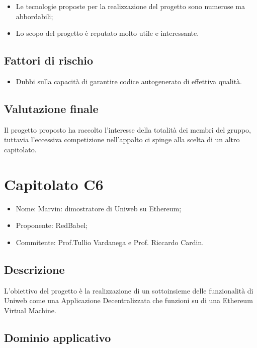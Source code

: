 \documentclass[openany,12pt,a4paper]{report}
\begin{document}
\begin{itemize}
    \item Le tecnologie proposte per la realizzazione del progetto sono numerose ma abbordabili;
    
    \item Lo scopo del progetto è reputato molto utile e interessante.
\end{itemize}

\subsection{Fattori di rischio}

\begin{itemize}
    \item Dubbi sulla capacità di garantire codice autogenerato di effettiva qualità.
\end{itemize}

\subsection{Valutazione finale}

Il progetto proposto ha raccolto l'interesse della totalità dei membri del gruppo, tuttavia l'eccessiva competizione nell'appalto ci spinge alla scelta di un altro capitolato.


\section{Capitolato C6}

\begin{itemize}
    \item{Nome:} Marvin: dimostratore di Uniweb su Ethereum;
    \item{Proponente:} RedBabel;
    \item{Commitente:} Prof.Tullio Vardanega e Prof. Riccardo Cardin.
\end{itemize}

\subsection{Descrizione}

L'obiettivo del progetto è la realizzazione di un sottoinsieme delle funzionalità di Uniweb come una Applicazione Decentralizzata che funzioni su di una Ethereum Virtual Machine.  

\subsection{Dominio applicativo}
\end{document}
